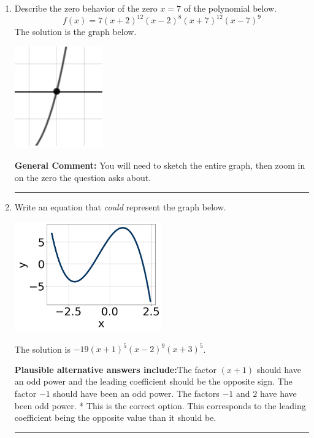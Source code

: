 \documentclass{extbook}[14pt]
\newcommand{\litem}[1]{\item #1

\rule{\textwidth}{0.4pt}}
\begin{document}
\begin{enumerate}\litem{
Describe the zero behavior of the zero $x = 7$ of the polynomial below.
\[ f(x) = 7(x + 2)^{12}(x - 2)^{8}(x + 7)^{12}(x - 7)^{9} \]The solution is the graph below.
    \begin{center}
        \includegraphics[width=0.3\textwidth]{../Figures/polyZeroBehaviorDA.png}
    \end{center}

\textbf{General Comment:} You will need to sketch the entire graph, then zoom in on the zero the question asks about.
}
\litem{
Write an equation that \textit{could} represent the graph below.

\begin{center}
    \includegraphics[width=0.5\textwidth]{../Figures/polyGraphToFunctionA.png}
\end{center}


The solution is \( -19(x + 1)^{5} (x - 2)^{9} (x + 3)^{5} \).\begin{enumerate}[label=\Alph*.]
\textbf{Plausible alternative answers include:}The factor $(x + 1)$ should have an odd power and the leading coefficient should be the opposite sign.
The factor $-1$ should have been an odd power.
The factors $-1$ and $2$ have have been odd power.
* This is the correct option.
This corresponds to the leading coefficient being the opposite value than it should be.
\end{enumerate}

}
\end{enumerate}
\end{document}
